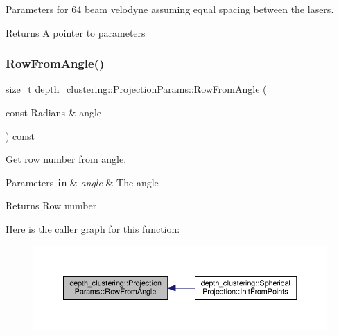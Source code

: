 Parameters for 64 beam velodyne assuming equal spacing between the lasers. 

\begin{DoxyReturn}{Returns}
A pointer to parameters 
\end{DoxyReturn}
\mbox{\label{classdepth__clustering_1_1ProjectionParams_ac9f61c77accaec1b6b60da0afe2dcf5e}} 
\subsubsection{\texorpdfstring{Row\+From\+Angle()}{RowFromAngle()}}
{\footnotesize\ttfamily size\+\_\+t depth\+\_\+clustering\+::\+Projection\+Params\+::\+Row\+From\+Angle (\begin{DoxyParamCaption}\item[{const Radians \&}]{angle }\end{DoxyParamCaption}) const}



Get row number from angle. 


\begin{DoxyParams}[1]{Parameters}
\mbox{\tt in}  & {\em angle} & The angle\\
\hline
\end{DoxyParams}
\begin{DoxyReturn}{Returns}
Row number 
\end{DoxyReturn}
Here is the caller graph for this function\+:\nopagebreak
\begin{figure}[H]
\begin{center}
\leavevmode
\includegraphics[width=350pt]{classdepth__clustering_1_1ProjectionParams_ac9f61c77accaec1b6b60da0afe2dcf5e_icgraph}
\end{center}
\end{figure}
\mbox{\label{classdepth__clustering_1_1ProjectionParams_a0348997a7db34e534270d9a71619b8a9}} 
